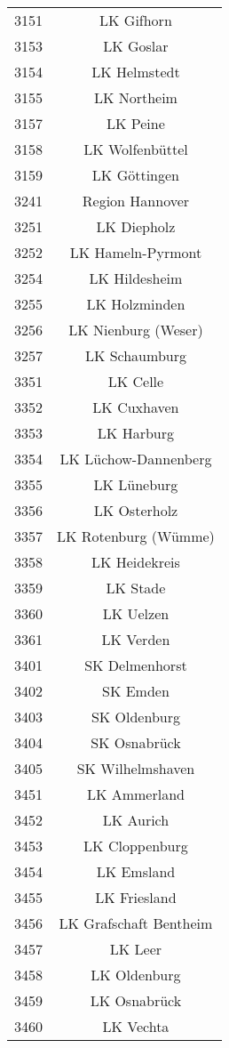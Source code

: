\begin{tabular}{c c}
    3151&LK Gifhorn\\ 
    3153&LK Goslar\\ 
    3154&LK Helmstedt\\ 
    3155&LK Northeim\\ 
    3157&LK Peine\\ 
    3158&LK Wolfenbüttel\\ 
    3159&LK Göttingen\\ 
    3241&Region Hannover\\ 
    3251&LK Diepholz\\ 
    3252&LK Hameln-Pyrmont\\ 
    3254&LK Hildesheim\\ 
    3255&LK Holzminden\\ 
    3256&LK Nienburg (Weser)\\ 
    3257&LK Schaumburg\\ 
    3351&LK Celle\\ 
    3352&LK Cuxhaven\\ 
    3353&LK Harburg\\ 
    3354&LK Lüchow-Dannenberg\\ 
    3355&LK Lüneburg\\ 
    3356&LK Osterholz\\ 
    3357&LK Rotenburg (Wümme)\\ 
    3358&LK Heidekreis\\ 
    3359&LK Stade\\ 
    3360&LK Uelzen\\ 
    3361&LK Verden\\ 
    3401&SK Delmenhorst\\ 
    3402&SK Emden\\ 
    3403&SK Oldenburg\\ 
    3404&SK Osnabrück\\ 
    3405&SK Wilhelmshaven\\ 
    3451&LK Ammerland\\ 
    3452&LK Aurich\\ 
    3453&LK Cloppenburg\\ 
    3454&LK Emsland\\ 
    3455&LK Friesland\\ 
    3456&LK Grafschaft Bentheim\\ 
    3457&LK Leer\\ 
    3458&LK Oldenburg\\ 
    3459&LK Osnabrück\\ 
    3460&LK Vechta\\ 

\end{tabular}
